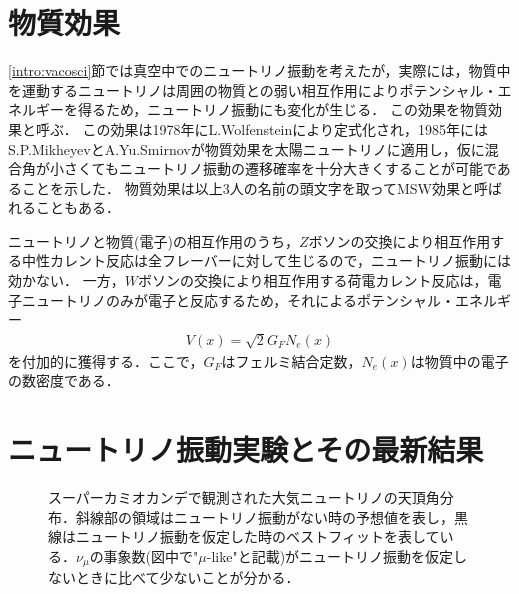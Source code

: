 \documentclass[../../main.tex]{subfiles}
\begin{document}
\section{物質効果}

\ref{intro:vacosci}節では真空中でのニュートリノ振動を考えたが，実際には，物質中を運動するニュートリノは周囲の物質との弱い相互作用によりポテンシャル・エネルギーを得るため，ニュートリノ振動にも変化が生じる．
この効果を物質効果と呼ぶ．
この効果は1978年にL.Wolfensteinにより定式化され\cite{intro:MSWwolfenstein}，1985年にはS.P.MikheyevとA.Yu.Smirnovが物質効果を太陽ニュートリノに適用し，仮に混合角が小さくてもニュートリノ振動の遷移確率を十分大きくすることが可能であることを示した\cite{intro:MSWsmirnov}．
物質効果は以上3人の名前の頭文字を取ってMSW効果と呼ばれることもある．

ニュートリノと物質(電子)の相互作用のうち，$Z$ボソンの交換により相互作用する中性カレント反応は全フレーバーに対して生じるので，ニュートリノ振動には効かない．
一方，$W$ボソンの交換により相互作用する荷電カレント反応は，電子ニュートリノのみが電子と反応するため，それによるポテンシャル・エネルギー
\begin{align}
  V(x)=\sqrt{2}G_{F}N_e(x)
\end{align}
を付加的に獲得する．ここで，$G_{F}$はフェルミ結合定数，$N_e(x)$は物質中の電子の数密度である．

\section{ニュートリノ振動実験とその最新結果}

\begin{figure}[htbp]
  \centering
  \caption[スーパーカミオカンデで観測された大気ニュートリノの天頂角分布]{スーパーカミオカンデで観測された大気ニュートリノの天頂角分布\cite{intro:SKneuosi}．斜線部の領域はニュートリノ振動がない時の予想値を表し，黒線はニュートリノ振動を仮定した時のベストフィットを表している．$\nu_{\mu}$の事象数(図中で"$\mu$-like"と記載)がニュートリノ振動を仮定しないときに比べて少ないことが分かる．}
  \label{fig:intro:SKneutrinoosc}
\end{figure}
\end{document}
